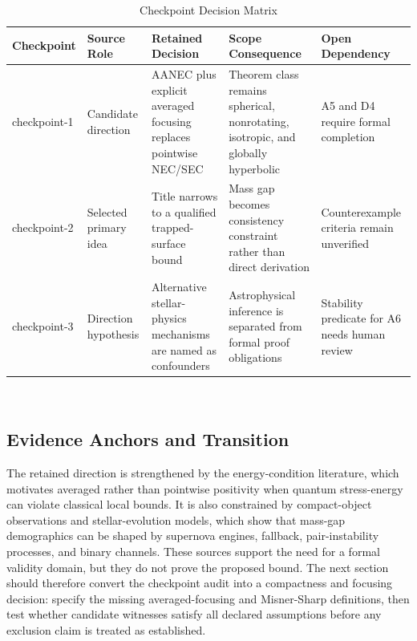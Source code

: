 \documentclass[conference]{IEEEtran}
\begin{document}
\begin{table}[htbp]
\centering
\footnotesize
\setlength{\tabcolsep}{3pt}
\renewcommand{\arraystretch}{1.12}
\caption{Checkpoint Decision Matrix}
\label{tab:appendix-idea-evolution-block-2}
\begin{tabular}{|p{}|p{}|p{}|p{}|p{}|}
\hline
Checkpoint & Source Role & Retained Decision & Scope Consequence & Open Dependency \\\hline
checkpoint-1 & Candidate direction & AANEC plus explicit averaged focusing replaces pointwise NEC/SEC & Theorem class remains spherical, nonrotating, isotropic, and globally hyperbolic & A5 and D4 require formal completion \\\hline
checkpoint-2 & Selected primary idea & Title narrows to a qualified trapped-surface bound & Mass gap becomes consistency constraint rather than direct derivation & Counterexample criteria remain unverified \\\hline
checkpoint-3 & Direction hypothesis & Alternative stellar-physics mechanisms are named as confounders & Astrophysical inference is separated from formal proof obligations & Stability predicate for A6 needs human review \\\hline
\end{tabular}
\end{table}~\cite{cite_0ed84243cf171bc4,cite_72d7ff391b29c495,cite_7a407c865faafd11}

\subsection{Evidence Anchors and Transition}
The retained direction is strengthened by the energy-condition literature, which motivates averaged rather than pointwise positivity when quantum stress-energy can violate classical local bounds. It is also constrained by compact-object observations and stellar-evolution models, which show that mass-gap demographics can be shaped by supernova engines, fallback, pair-instability processes, and binary channels. These sources support the need for a formal validity domain, but they do not prove the proposed bound. The next section should therefore convert the checkpoint audit into a compactness and focusing decision: specify the missing averaged-focusing and Misner-Sharp definitions, then test whether candidate witnesses satisfy all declared assumptions before any exclusion claim is treated as established.~\cite{cite_07d6df5d6978a1fc,cite_cbbced417410bc6c,cite_f634820e22d7a238,cite_fd0f77b2a173c0ab}
\end{document}
